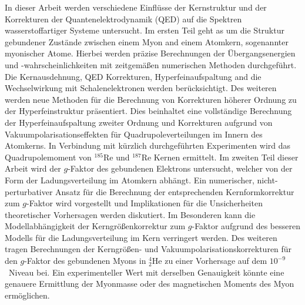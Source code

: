 
{\small
In dieser Arbeit werden verschiedene Einflüsse der Kernstruktur und der Korrekturen der Quantenelektrodynamik (QED) auf die Spektren wasserstoffartiger Systeme untersucht.
Im ersten Teil geht as um die Struktur gebundener Zustände zwischen einem Myon and einem Atomkern, sogenannter myonischer Atome.
Hierbei werden präzise Berechnungen der Übergangsenergien und -wahrscheinlichkeiten mit zeitgemäßen numerischen Methoden durchgeführt. Die Kernausdehnung, QED Korrekturen, Hyperfeinaufspaltung and die Wechselwirkung mit Schalenelektronen werden berücksichtigt. Des weiteren werden neue Methoden für die Berechnung von Korrekturen höherer Ordnung zu der Hyperfeinstruktur präsentiert. Dies beinhaltet eine vollständige Berechnung der Hyperfeinaufspaltung zweiter Ordnung und Korrekturen aufgrund von Vakuumpolarisationseffekten für Quadrupoleverteilungen im Innern des Atomkerns. 
In Verbindung mit kürzlich durchgeführten Experimenten wird das Quadrupolemoment von $^{185}$Re und $^{187}$Re Kernen ermittelt.
Im zweiten Teil dieser Arbeit wird der $g$-Faktor des gebundenen Elektrons untersucht, welcher von der Form der Ladungsverteilung im Atomkern abhängt. Ein numerischer, nicht-perturbativer Ansatz für die Berechnung der entsprechenden Kernformkorrektur zum $g$-Faktor wird vorgestellt und Implikationen für die Unsicherheiten theoretischer Vorhersagen werden diskutiert. Im Besonderen kann die Modellabhängigkeit der Kerngrößenkorrektur zum $g$-Faktor aufgrund des besseren Modells für die Ladungsverteilung im Kern verringert werden.
Des weiteren tragen Berechnungen der Kerngrößen- und Vakuumpolarisationskorrekturen für den $g$-Faktor des gebundenen Myons in $^{4}_2$He zu einer Vorhersage auf dem $10^{-9}$~Niveau bei. Ein experimenteller Wert mit derselben Genauigkeit könnte eine genauere Ermittlung der Myonmasse oder des magnetischen Moments des Myon ermöglichen.
}
